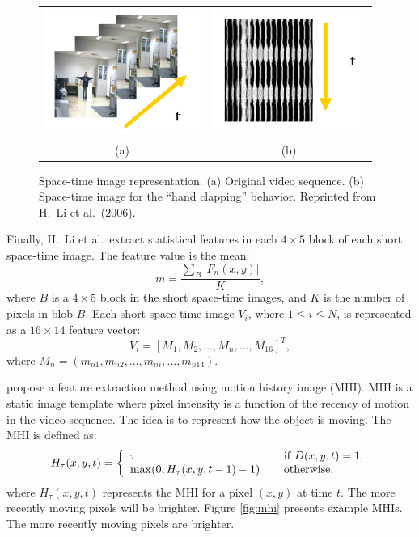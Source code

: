 \begin{figure}[t]
  \centering
  \begin{tabular}{cc}
    \includegraphics[width=2in]{figures/space-time-original.png} &
    \includegraphics[width=2in]{figures/space-time-image.png} \\
    (a) & (b)
  \end{tabular}
  \caption[Space-time image representation.]{\small Space-time image
    representation. (a) Original video sequence. (b) Space-time image
    for the ``hand clapping'' behavior. Reprinted from H.\ Li et al.\
    (2006).}
  \label{fig:space-time-feature}
\end{figure}

Finally, H.\ Li et al.\ extract statistical features in each
$4 \times 5$ block of each short space-time image. The feature value
is the mean:
\[
  m = \frac{\displaystyle\sum_B | F_n(x, y)|}{K},
\]
where $B$ is a $4 \times 5$ block in the short space-time images, and
$K$ is the number of pixels in blob $B$. Each short space-time image
$V_i$, where $1 \le i \le N$, is represented as a $16 \times 14$
feature vector:
\[
  V_i = [M_1, M_2, \ldots, M_n, \ldots, M_{16}]^T,
\]
where $M_n = (m_{n1}, m_{n2}, \ldots, m_{ni}, \ldots, m_{n14})$.

 propose a feature extraction method using
motion history image (MHI). MHI is a static image template where pixel
intensity is a function of the recency of motion in the video
sequence. The idea is to represent how the object is moving. The MHI
is defined as:
\[
  \begin{array}{ll}
    H_\tau (x,y,t) = \left\{ 
    \begin{array}{l}
      \tau \\ 
      \max (0, H_\tau (x, y, t - 1) - 1)
    \end{array} \right.
    &
    \begin{array}{l}
      {\rm if}\;D(x, y, t) = 1, \hfill  \\
      {\rm otherwise}, \hfill 
    \end{array}
  \end{array}
\]
where $H_\tau (x,y,t)$ represents the MHI for a pixel $(x,y)$ at time
$t$. The more recently moving pixels will be
brighter. Figure \ref{fig:mhi} presents example MHIs. The more
recently moving pixels are brighter.

